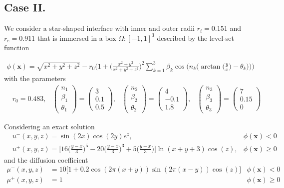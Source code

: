 \documentclass{elsarticle}
\begin{document}
\subsection{Case II.}



We consider a star-shaped interface with inner and outer radii $r_i=0.151$ and $r_e=0.911$ that is immersed in a box $\Omega:[-1,1]^3$ described by the level-set function

\begin{align*}
\phi(\mathbf{x}) = \sqrt{x^2 + y^2 + z^2} - r_0 \bigg( 1 + \big( \frac{x^2 + y^2}{x^2 + y^2 + z^2}\big)^2  \sum_{k=1}^3 \beta_k \cos\big(n_k \big(\arctan\big(\frac{y}{x}\big) - \theta_k\big) \big) \bigg)
\end{align*}
with the parameters
\begin{align*}
&r_0 = 0.483, &\begin{pmatrix}
n_1\\
\beta_1\\
\theta_1
\end{pmatrix}=\begin{pmatrix}
3\\
0.1\\
0.5
\end{pmatrix}, &\begin{pmatrix}
n_2\\
\beta_2\\
\theta_2
\end{pmatrix}=\begin{pmatrix}
4\\
-0.1\\
1.8
\end{pmatrix}, &\begin{pmatrix}
n_3\\
\beta_3\\
\theta_3
\end{pmatrix}=\begin{pmatrix}
7\\
0.15\\
0
\end{pmatrix}
\end{align*}

Considering an exact solution 
\begin{align*}
& u^-(x,y,z)=\sin(2x)\cos(2y) e^{z}, & \phi(\mathbf{x})<0\\
& u^+(x,y,z)=\bigg[ 16\big(\frac{y-x}{3}\big)^5 - 20 \big(\frac{y-x}{3}\big)^3 + 5\big( \frac{y-x}{3}\big) \bigg]\ln(x+y+3)\cos(z)          , & \phi(\mathbf{x})\ge 0
\end{align*}
and the diffusion coefficient
\begin{align*}
\mu^-(x,y,z)&=10\bigg[ 1+0.2\cos(2\pi(x+y))\sin(2\pi(x-y)) \cos(z) \bigg] &\phi(\mathbf{x})<0 \\
\mu^+(x,y,z)&=1 &\phi(\mathbf{x})\ge 0 
\end{align*}
\end{document}
